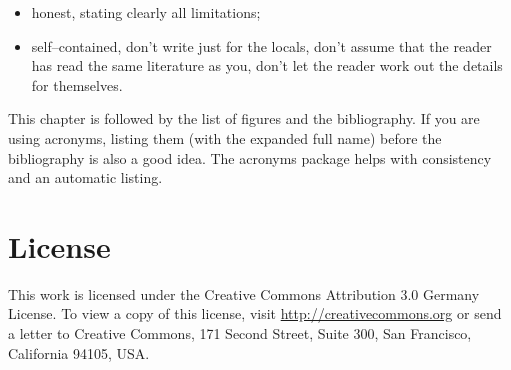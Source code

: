 \documentclass[a4paper,twoside, openright,12pt]{report}
\begin{document}
\begin{itemize}
	\item honest, stating clearly all limitations;
	\item self--contained, don't write just for the locals, don't assume that the reader has read the same literature as you, don't let the reader work out the details for themselves.
\end{itemize}



This chapter is followed by the list of figures and the bibliography. If you are using acronyms, listing them (with the expanded full name) before the bibliography is also a good idea. The acronyms package helps with consistency and an automatic listing.




\cleardoublepage
{} 
\listoffigures 	 %


\cleardoublepage
{}




\cleardoublepage
\chapter*{License}
This work is licensed under the Creative Commons Attribution 3.0 Germany
License. To view a copy of this license,
visit \href{http://creativecommons.org/licenses/by/3.0/de/}{http://creativecommons.org} or send a letter
to Creative Commons, 171 Second Street, Suite 300, San
Francisco, California 94105, USA.
\end{document}
